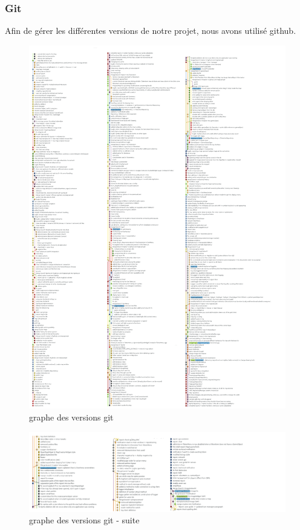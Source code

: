 \subsubsection{Git}

Afin de gérer les différentes versions de notre projet, nous avons utilisé github.

\begin{figure}[h!]
	\centering
	\includegraphics[width=1\textwidth]{img/state_git_graph.png}
	\caption{graphe des versions git}
	\label{fig:notification}
\end{figure}

\newpage
\begin{figure}[h!]
	\centering
	\includegraphics[width=1\textwidth]{img/state_git_graph_2.png}
	\caption{graphe des versions git - suite}
	\label{fig:notification}
\end{figure}